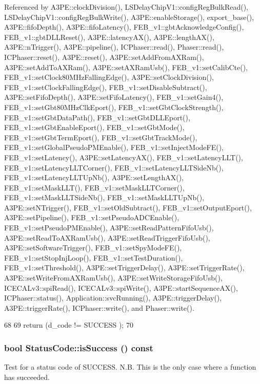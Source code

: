 Referenced by A3PE::clockDivision(), LSDelayChipV1::configRegBulkRead(), LSDelayChipV1::configRegBulkWrite(), A3PE::enableStorage(), export\_\-base(), A3PE::fifoDepth(), A3PE::fifoLatency(), FEB\_\-v1::gbtAcknowledgeConfig(), FEB\_\-v1::gbtDLLReset(), A3PE::latencyAX(), A3PE::lengthAX(), A3PE::nTrigger(), A3PE::pipeline(), ICPhaser::read(), Phaser::read(), ICPhaser::reset(), A3PE::reset(), A3PE::setAddFromAXRam(), A3PE::setAddToAXRam(), A3PE::setAXRamUsb(), FEB\_\-v1::setCalibCte(), FEB\_\-v1::setClock80MHzFallingEdge(), A3PE::setClockDivision(), FEB\_\-v1::setClockFallingEdge(), FEB\_\-v1::setDisableSubtract(), A3PE::setFifoDepth(), A3PE::setFifoLatency(), FEB\_\-v1::setGain4(), FEB\_\-v1::setGbt80MHzClkEport(), FEB\_\-v1::setGbtClockStrength(), FEB\_\-v1::setGbtDataPath(), FEB\_\-v1::setGbtDLLEport(), FEB\_\-v1::setGbtEnableEport(), FEB\_\-v1::setGbtMode(), FEB\_\-v1::setGbtTermEport(), FEB\_\-v1::setGbtTrackMode(), FEB\_\-v1::setGlobalPseudoPMEnable(), FEB\_\-v1::setInjectModeFE(), FEB\_\-v1::setLatency(), A3PE::setLatencyAX(), FEB\_\-v1::setLatencyLLT(), FEB\_\-v1::setLatencyLLTCorner(), FEB\_\-v1::setLatencyLLTSideNb(), FEB\_\-v1::setLatencyLLTUpNb(), A3PE::setLengthAX(), FEB\_\-v1::setMaskLLT(), FEB\_\-v1::setMaskLLTCorner(), FEB\_\-v1::setMaskLLTSideNb(), FEB\_\-v1::setMaskLLTUpNb(), A3PE::setNTrigger(), FEB\_\-v1::setOldSubtract(), FEB\_\-v1::setOutputEport(), A3PE::setPipeline(), FEB\_\-v1::setPseudoADCEnable(), FEB\_\-v1::setPseudoPMEnable(), A3PE::setReadPatternFifoUsb(), A3PE::setReadToAXRamUsb(), A3PE::setReadTriggerFifoUsb(), A3PE::setSoftwareTrigger(), FEB\_\-v1::setSpyModeFE(), FEB\_\-v1::setStopInjLoop(), FEB\_\-v1::setTestDuration(), FEB\_\-v1::setThreshold(), A3PE::setTriggerDelay(), A3PE::setTriggerRate(), A3PE::setWriteFromAXRamUsb(), A3PE::setWriteStorageFifoUsb(), ICECALv3::spiRead(), ICECALv3::spiWrite(), A3PE::startSequenceAX(), ICPhaser::status(), Application::svcRunning(), A3PE::triggerDelay(), A3PE::triggerRate(), ICPhaser::write(), and Phaser::write().


\begin{DoxyCode}
68                                         {
69   return (d_code != SUCCESS );
70 }
\end{DoxyCode}
\hypertarget{classStatusCode_aa9517f7106b77565d0eda20a9b37e705}{
\subsubsection[{isSuccess}]{\setlength{\rightskip}{0pt plus 5cm}bool StatusCode::isSuccess () const}}
\label{classStatusCode_aa9517f7106b77565d0eda20a9b37e705}
Test for a status code of SUCCESS. N.B. This is the only case where a function has succeeded. 

